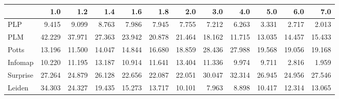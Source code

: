 \begin{tabular}{lrrrrrrrrrrr}
\toprule
{} &    1.0 &    1.2 &    1.4 &    1.6 &    1.8 &    2.0 &    3.0 &    4.0 &    5.0 &    6.0 &    7.0 \\
\midrule
PLP      &  9.415 &  9.099 &  8.763 &  7.986 &  7.945 &  7.755 &  7.212 &  6.263 &  3.331 &  2.717 &  2.013 \\
PLM      & 42.229 & 37.971 & 27.363 & 23.942 & 20.878 & 21.464 & 18.162 & 11.715 & 13.035 & 14.457 & 15.433 \\
Potts    & 13.196 & 11.500 & 14.047 & 14.844 & 16.680 & 18.859 & 28.436 & 27.988 & 19.568 & 19.056 & 19.168 \\
Infomap  & 10.220 & 11.195 & 13.187 & 10.914 & 11.641 & 13.404 & 11.336 &  9.974 &  9.711 &  2.816 &  1.959 \\
Surprise & 27.264 & 24.879 & 26.128 & 22.656 & 22.087 & 22.051 & 30.047 & 32.314 & 26.945 & 24.956 & 27.546 \\
Leiden   & 34.303 & 24.327 & 19.435 & 15.273 & 13.717 & 10.101 &  7.963 &  8.898 & 10.417 & 12.314 & 13.065 \\
\bottomrule
\end{tabular}

